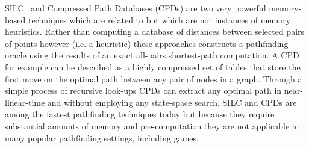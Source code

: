 SILC~\citep{sanka05} and Compressed Path Databases (CPDs) are two very
powerful memory-based techniques which are related to but which are not
instances of memory heuristics. Rather than computing a database of distances
between selected pairs of points however (i.e. a heuristic) these approaches
constructs a pathfinding oracle using the results of an exact all-pairs
shortest-path computation.  A CPD for example can be described as a highly
compressed set of tables that store the first move on the optimal path between
any pair of nodes in a graph. Through a simple process of recursive look-ups
CPDs can extract any optimal path in near-linear-time and without employing
any state-space search.  SILC and CPDs are among the fastest pathfinding
techniques today but because they require substantial amounts of memory and
pre-computation they are not applicable in many popular pathfinding settings,
including games.

